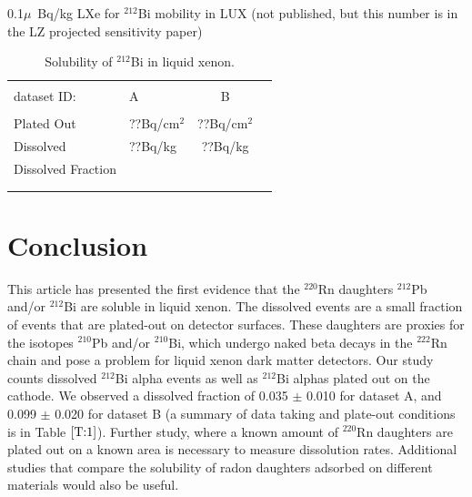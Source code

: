 0.1$\mu$~Bq/kg LXe for $^{212}$Bi mobility in LUX (not published, but this number is in the LZ projected sensitivity paper)


\begin{table}[ht]
\centering
\caption{Solubility of $^{212}$Bi in liquid xenon.}
\begin{tabular}{llcc}
\hline
\\[-5pt]
dataset ID: & A &B \\
\hline
\\[-5pt]

Plated Out & ??Bq/cm$^{2}$ & ??Bq/cm$^{2}$ \\
Dissolved & ??Bq/kg & ??Bq/kg \\
Dissolved Fraction &  & \\
\\[-5pt]

\\[-5pt]

\hline
\end{tabular}
\label{T:4}
\end{table}

\section{Conclusion}
\label{conclusion}
This article has presented the first evidence that the $^{220}$Rn daughters $^{212}$Pb and/or $^{212}$Bi are soluble in liquid xenon. The dissolved events are a small fraction of events that are plated-out on detector surfaces. These daughters are proxies for the isotopes $^{210}$Pb and/or $^{210}$Bi, which undergo naked beta decays in the $^{222}$Rn chain and pose a problem for liquid xenon dark matter detectors. Our study counts dissolved $^{212}$Bi alpha events as well as $^{212}$Bi alphas plated out on the cathode. We observed a dissolved fraction of 0.035 $\pm$ 0.010 for dataset A, and 0.099 $\pm$ 0.020 for dataset B (a summary of data taking and plate-out conditions is in Table $\ref{T:1}$). Further study, where a known amount of $^{220}$Rn daughters are plated out on a known area is necessary to measure dissolution rates. Additional studies that compare the solubility of radon daughters adsorbed on different materials would also be useful.

